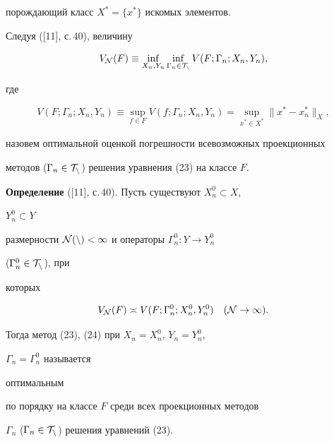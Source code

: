 порождающий класс $X^*=\{x^*\}$ искомых элементов. 


 


Следуя ([11], с.\,40), величину 


\begin{equation} 


V_{\cal N}(F)\equiv\inf_{X_n,Y_n}\inf_{\Gamma_n\in\cal T_n} 


V(F;\Gamma_n;X_n,Y_n), 


\end{equation} 


где 


$$ 


V(F;\Gamma_n;X_n,Y_n)\equiv\sup_{f\in F}V(f;\Gamma_n;X_n,Y_n)= 


\sup_{x^*\in X^*}\|x^*-x^*_n\|_X, 


$$ 


назовем оптимальной оценкой погрешности всевозможных проекционных 


методов ($\Gamma_n\in\cal T_n$) решения уравнения (23) на классе $F$. 


\medskip 


 


{\bf Определение} ([11], с.\,40). Пусть существуют $X^0_n\subset X$, 


$Y^0_n\subset Y$ 


размерности $\cal N(n)<\infty$ и операторы $\Gamma^0_n:Y\to Y^0_n$ 


($\Gamma^0_n\in\cal T_n$), при 


которых 


\begin{equation} 


V_{\cal N}(F)\asymp V(F;\Gamma^0_n;X^0_n,Y^0_n)\quad 


(\cal N\to\infty). 


\end{equation} 


Тогда метод (23), (24) при $X_n=X^0_n$, $Y_n=Y^0_n$, 


$\Gamma_n=\Gamma^0_n$ называется 


оптимальным 


по порядку на классе $F$ среди всех проекционных методов 


$\Gamma_n$ ($\Gamma_n\in\cal T_n$) решения уравнений (23). 


\medskip 


 



